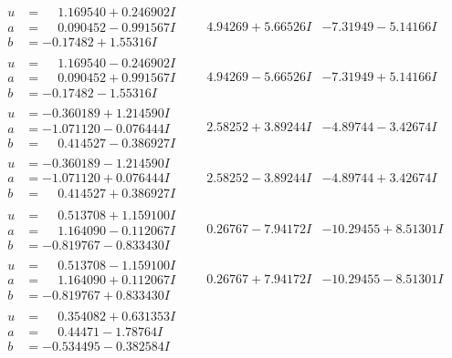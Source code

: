 \documentclass[1p]{elsarticle_modified}
\theoremstyle{definition}
\begin{document}
$$\begin{array}{c|c|c}
\begin{aligned}
u &= \phantom{-}1.169540 + 0.246902 I \\
a &= \phantom{-}0.090452 - 0.991567 I \\
b &= -0.17482 + 1.55316 I\end{aligned}
 & \phantom{-}4.94269 + 5.66526 I & -7.31949 - 5.14166 I \\ \hline\begin{aligned}
u &= \phantom{-}1.169540 - 0.246902 I \\
a &= \phantom{-}0.090452 + 0.991567 I \\
b &= -0.17482 - 1.55316 I\end{aligned}
 & \phantom{-}4.94269 - 5.66526 I & -7.31949 + 5.14166 I \\ \hline\begin{aligned}
u &= -0.360189 + 1.214590 I \\
a &= -1.071120 - 0.076444 I \\
b &= \phantom{-}0.414527 - 0.386927 I\end{aligned}
 & \phantom{-}2.58252 + 3.89244 I & -4.89744 - 3.42674 I \\ \hline\begin{aligned}
u &= -0.360189 - 1.214590 I \\
a &= -1.071120 + 0.076444 I \\
b &= \phantom{-}0.414527 + 0.386927 I\end{aligned}
 & \phantom{-}2.58252 - 3.89244 I & -4.89744 + 3.42674 I \\ \hline\begin{aligned}
u &= \phantom{-}0.513708 + 1.159100 I \\
a &= \phantom{-}1.164090 - 0.112067 I \\
b &= -0.819767 - 0.833430 I\end{aligned}
 & \phantom{-}0.26767 - 7.94172 I & -10.29455 + 8.51301 I \\ \hline\begin{aligned}
u &= \phantom{-}0.513708 - 1.159100 I \\
a &= \phantom{-}1.164090 + 0.112067 I \\
b &= -0.819767 + 0.833430 I\end{aligned}
 & \phantom{-}0.26767 + 7.94172 I & -10.29455 - 8.51301 I \\ \hline\begin{aligned}
u &= \phantom{-}0.354082 + 0.631353 I \\
a &= \phantom{-}0.44471 - 1.78764 I \\
b &= -0.534495 - 0.382584 I\end{aligned}

\end{array}$$
\end{document}
